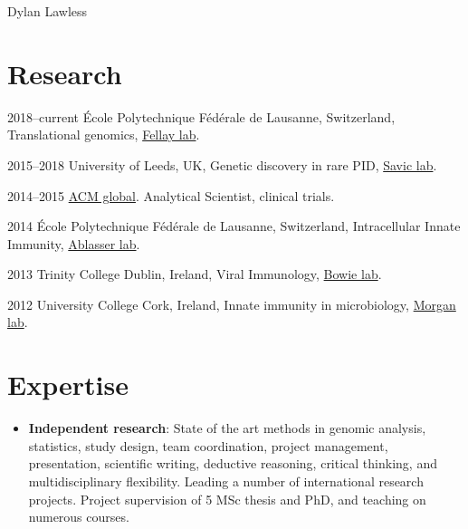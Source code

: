 \documentclass[11pt,a4paper]{article}
\begin{document}
\begin{cv}{Dylan Lawless}
\section*{Research}
\begin{cvlist}{}
 \item [2018--current]  \'Ecole Polytechnique F\'ed\'erale de Lausanne, Switzerland, Translational genomics, \href{https://www.epfl.ch/labs/fellay-lab/}{Fellay lab}.
  \item [2015--2018] University of Leeds, UK, Genetic discovery in rare PID, \href{https://medicinehealth.leeds.ac.uk/medicine/staff/3046/dr-sinisa-savic}{Savic lab}.
  \item[2014--2015] \href{https://www.acmgloballab.com}{ACM global}. Analytical Scientist, clinical trials.
  \item [2014]  \'Ecole Polytechnique F\'ed\'erale de Lausanne, Switzerland, Intracellular Innate Immunity, \href{https://www.epfl.ch/labs/ablasserlab/}{Ablasser lab}.
  \item [2013] Trinity College Dublin, Ireland, Viral Immunology, \href{https://www.tcd.ie/Biochemistry/research/bowie/}{Bowie lab}.
  \item [2012] University College Cork, Ireland, Innate immunity in microbiology, \href{https://www.ucc.ie/en/microbiology/}{Morgan lab}.
  \end{cvlist}

\section*{Expertise}
 \begin{itemize}[leftmargin=*]

\item \textbf{Independent research}: State of the art methods in genomic analysis, statistics, study design, team coordination, project management, presentation, scientific writing, deductive reasoning, critical thinking, and multidisciplinary flexibility. Leading a number of international research projects.
Project supervision of 5 MSc thesis and PhD, and teaching on numerous courses.


\end{itemize}
\end{cv}
\end{document}
